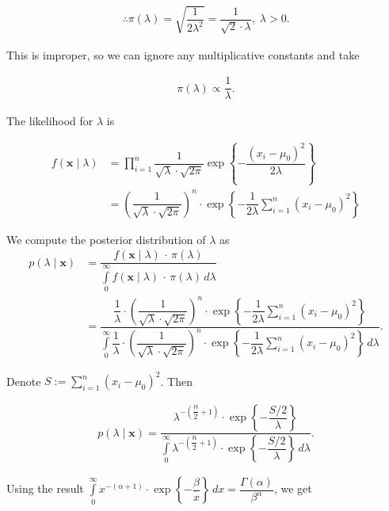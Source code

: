 \documentclass[12pt, a4paper]{article}
\begin{document}
\begin{align*}
\therefore \pi(\lambda) = \sqrt{\dfrac{1}{2\lambda^2}} = \dfrac{1}{\sqrt{2} \cdot \lambda}, \; \lambda > 0.
\end{align*}

This is improper, so we can ignore any multiplicative constants and take

\begin{align*}
\pi(\lambda) \propto \dfrac{1}{\lambda}.
\end{align*}



The likelihood for $\lambda$ is

\begin{align*}
f(\mathbf{x} \mid \lambda) &= \prod \limits_{i = 1}^{n} \dfrac{1}{\sqrt{\lambda} \cdot \sqrt{2\pi}} \exp\left\{ -\dfrac{(x_i-\mu_0)^2}{2\lambda} \right\} \\[1em]
&= \left( \dfrac{1}{\sqrt{\lambda} \cdot \sqrt{2\pi}} \right)^n \cdot \exp\left\{ -\dfrac{1}{2\lambda} \sum \limits_{i = 1}^{n}(x_i-\mu_0)^2 \right\}
\end{align*}

We compute the posterior distribution of $\lambda$ as
\begin{align*}
p(\lambda \mid \mathbf{x}) &= \dfrac{f(\mathbf{x} \mid \lambda) \, \cdot \, \pi(\lambda)}{\displaystyle \int\limits_{0}^{\infty} f(\mathbf{x} \mid \lambda) \, \cdot \, \pi(\lambda) \, d\lambda} \\[1em]
&= \dfrac{\dfrac{1}{\lambda} \cdot \left( \dfrac{1}{\sqrt{\lambda} \cdot \sqrt{2\pi}} \right)^n \cdot \exp\left\{ -\dfrac{1}{2\lambda} \sum \limits_{i = 1}^{n}(x_i-\mu_0)^2 \right\}}{\displaystyle \int\limits_{0}^{\infty} \dfrac{1}{\lambda} \cdot \left( \dfrac{1}{\sqrt{\lambda} \cdot \sqrt{2\pi}} \right)^n \cdot \exp\left\{ -\dfrac{1}{2\lambda} \sum \limits_{i = 1}^{n}(x_i-\mu_0)^2 \right\} \, d\lambda}.
\end{align*}

Denote $S := \sum \limits_{i = 1}^{n}(x_i-\mu_0)^2$. Then

\begin{align*}
p(\lambda \mid \mathbf{x}) = \dfrac{\lambda^{-\left(\dfrac{n}{2} + 1\right)} \cdot \exp\left\{- \dfrac{S/2}{\lambda} \right\}}{\displaystyle \int\limits_{0}^{\infty} \lambda^{-\left(\dfrac{n}{2} + 1\right)} \cdot \exp\left\{- \dfrac{S/2}{\lambda} \right\} \, d\lambda}.
\end{align*}

\newpage

Using the result $\displaystyle \int\limits_{0}^{\infty} x^{-(\alpha + 1)} \cdot \exp\left\{- \dfrac{\beta}{x} \right\} \, dx = \dfrac{\Gamma(\alpha)}{\beta^{\alpha}}$, we get
\end{document}
